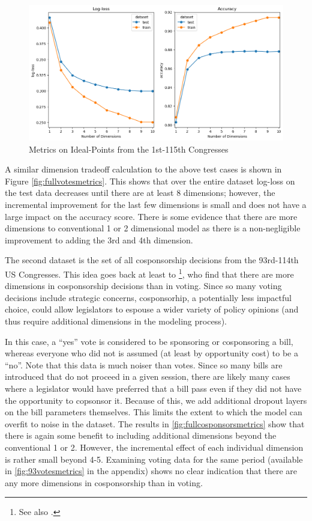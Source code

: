 \documentclass[11pt,]{article}
\begin{document}
\begin{figure}

{\centering \includegraphics[width=1\linewidth]{full_votes_metrics}

}

\caption{\label{fig:fullvotesmetrics}Metrics on Ideal-Points from the 1st-115th Congresses}\label{fig:unnamed-chunk-9}
\end{figure}

A similar dimension tradeoff calculation to the above test cases is
shown in Figure \ref{fig:fullvotesmetrics}. This shows that over the
entire dataset log-loss on the test data decreases until there are at
least 8 dimensions; however, the incremental improvement for the last
few dimensions is small and does not have a large impact on the accuracy
score. There is some evidence that there are more dimensions to
conventional 1 or 2 dimensional model as there is a non-negligible
improvement to adding the 3rd and 4th dimension.

The second dataset is the set of all cosponsorship decisions from the
93rd-114th US Congresses. This idea goes back at least to
\cite{talbert2002setting}\footnote{See also \cite{aleman2009comparing}.},
who find that there are more dimensions in cosponsorship decisions than
in voting. Since so many voting decisions include strategic concerns,
cosponsorhip, a potentially less impactful choice, could allow
legislators to espouse a wider variety of policy opinions (and thus
require additional dimensions in the modeling process).

In this case, a ``yes'' vote is considered to be sponsoring or
cosponsoring a bill, whereas everyone who did not is assumed (at least
by opportunity cost) to be a ``no''. Note that this data is much noiser
than votes. Since so many bills are introduced that do not proceed in a
given session, there are likely many cases where a legislator would have
preferred that a bill pass even if they did not have the opportunity to
copsonsor it. Because of this, we add additional dropout layers on the
bill parameters themselves. This limits the extent to which the model
can overfit to noise in the dataset. The results in
\ref{fig:fullcosponsorsmetrics} show that there is again some benefit to
including additional dimensions beyond the conventional 1 or 2. However,
the incremental effect of each individual dimension is rather small
beyond 4-5. Examining voting data for the same period (available in
\ref{fig:93votesmetrics} in the appendix) shows no clear indication that
there are any more dimensions in cosponsorship than in voting.
\end{document}
